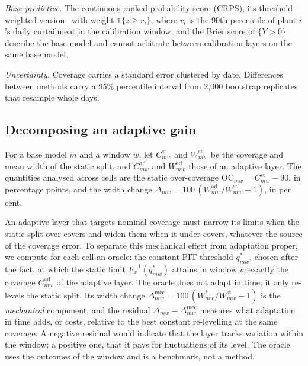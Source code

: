 \emph{Base predictive.} The continuous ranked probability score (CRPS), its threshold-weighted version~\cite{gneiting2011} with weight $\mathbb{1}\{z\ge r_i\}$, where $r_i$ is the 90th percentile of plant $i$'s daily curtailment in the calibration window, and the Brier score of $\{Y>0\}$ describe the base model and cannot arbitrate between calibration layers on the same base model.

\emph{Uncertainty.} Coverage carries a standard error clustered by date. Differences between methods carry a 95\% percentile interval from 2{,}000 bootstrap replicates that resample whole days.

\subsection{Decomposing an adaptive gain}
\label{sec:decomp}

For a base model $m$ and a window $w$, let $C^{\mathrm{st}}_{mw}$ and $W^{\mathrm{st}}_{mw}$ be the coverage and mean width of the static split, and $C^{\mathrm{ad}}_{mw}$ and $W^{\mathrm{ad}}_{mw}$ those of an adaptive layer. The quantities analysed across cells are the static over-coverage $\mathrm{OC}_{mw}=C^{\mathrm{st}}_{mw}-90$, in percentage points, and the width change $\Delta_{mw}=100\,(W^{\mathrm{ad}}_{mw}/W^{\mathrm{st}}_{mw}-1)$, in per cent.

An adaptive layer that targets nominal coverage must narrow its limits when the static split over-covers and widen them when it under-covers, whatever the source of the coverage error. To separate this mechanical effect from adaptation proper, we compute for each cell an oracle: the constant PIT threshold $q^\ast_{mw}$, chosen after the fact, at which the static limit $F_x^{-1}(q^\ast_{mw})$ attains in window $w$ exactly the coverage $C^{\mathrm{ad}}_{mw}$ of the adaptive layer. The oracle does not adapt in time; it only re-levels the static split. Its width change $\Delta^{\mathrm{mec}}_{mw}=100\,(W^\ast_{mw}/W^{\mathrm{st}}_{mw}-1)$ is the \emph{mechanical} component, and the residual $\Delta_{mw}-\Delta^{\mathrm{mec}}_{mw}$ measures what adaptation in time adds, or costs, relative to the best constant re-levelling at the same coverage. A negative residual would indicate that the layer tracks variation within the window; a positive one, that it pays for fluctuations of its level. The oracle uses the outcomes of the window and is a benchmark, not a method.


